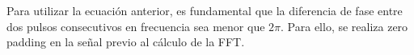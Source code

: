 Para utilizar la ecuación anterior, es fundamental que la diferencia de fase entre dos pulsos consecutivos en frecuencia sea menor que $2\pi$. Para ello, se realiza zero padding en la señal previo al cálculo de la FFT.







